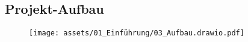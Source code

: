 \subsection{Projekt-Aufbau}

\begin{figure}[H]
    \centering
    \texttt{[image: assets/01\_Einführung/03\_Aufbau.drawio.pdf]}
\end{figure}


\clearpage
